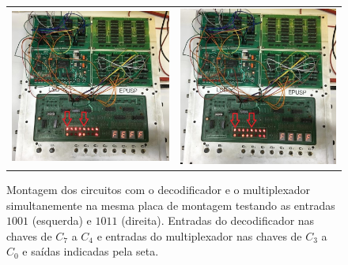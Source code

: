 \documentclass[a4,12pt]{horizon-theme}
\begin{document}
\begin{figure}[!ht]
  \centering
  \begin{tabular}{cc}
    \includegraphics[height=0.46\textwidth]{1001_in.jpeg} & \includegraphics[height=0.46\textwidth]{1011_in.jpeg}
  \end{tabular}
  \caption{Montagem dos circuitos com o decodificador e o multiplexador simultanemente na mesma placa de montagem testando as entradas $1001$ (esquerda) e $1011$ (direita). Entradas do decodificador nas chaves de $C_7$ a $C_4$ e entradas do multiplexador nas chaves de $C_3$ a $C_0$ e saídas indicadas pela seta.}
  \label{fig:montagem3}
\end{figure}
\newpage




\horizonBackCover
\end{document}
